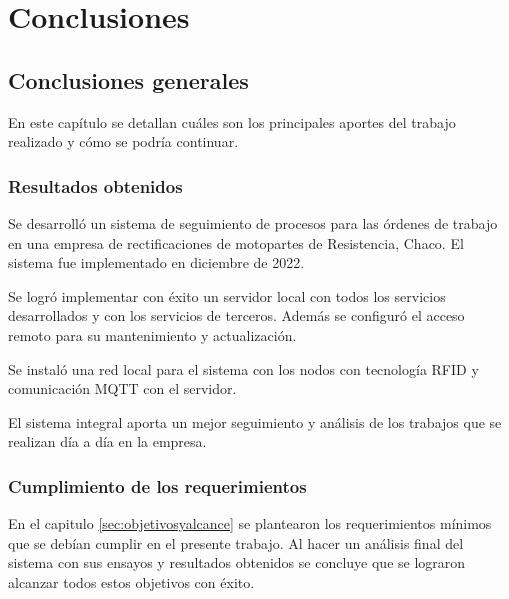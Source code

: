 
\chapter{Conclusiones} %

\label{Chapter5} %




\section{Conclusiones generales }

En este capítulo se detallan cuáles son los principales aportes del trabajo realizado y cómo se podría continuar. 

\subsection{Resultados obtenidos}

Se desarrolló un sistema de seguimiento de procesos para las órdenes de trabajo en una empresa de rectificaciones de motopartes de Resistencia, Chaco. El sistema fue implementado en diciembre de 2022. 

Se logró implementar con éxito un servidor local con todos los servicios desarrollados y con los servicios de terceros. Además se configuró el acceso remoto para su mantenimiento y actualización.

Se instaló una red local para el sistema con los nodos con tecnología RFID y comunicación MQTT con el servidor.

El sistema integral aporta un mejor seguimiento y análisis de los trabajos que se realizan día a día en la empresa.

\subsection{Cumplimiento de los requerimientos}

En el capitulo \ref{sec:objetivosyalcance} se plantearon los requerimientos mínimos que se debían cumplir en el presente trabajo. Al hacer un análisis final del sistema con sus ensayos y resultados obtenidos se concluye que se lograron alcanzar todos estos objetivos con éxito. 

